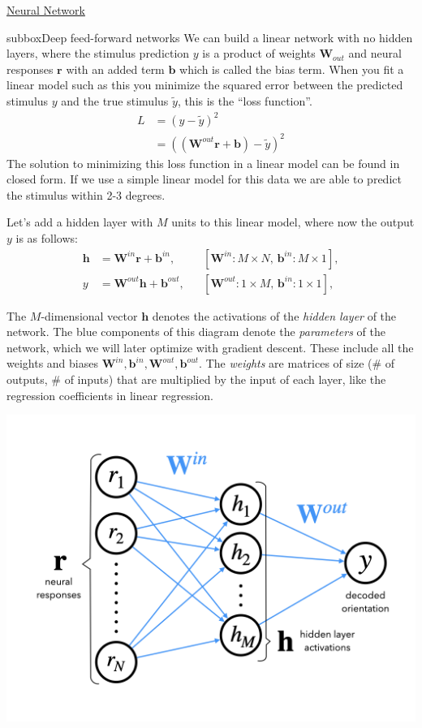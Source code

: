 \begin{textbox}{\href{https://compneuro.neuromatch.io/tutorials/W1D5_DeepLearning/student/W1D5_Tutorial1.html}{Neural Network } }
\begin{subbox}{subbox}{Deep feed-forward networks}
\scriptsize
We can build a linear network with no hidden layers, where the stimulus prediction $y$ is a product of weights $\mathbf{W}_{out}$ and neural responses $\mathbf{r}$ with an added term $\mathbf{b}$ which is called the bias term. When you fit a linear model such as this you minimize the squared error between the predicted stimulus $y$ and the true stimulus $\tilde{y}$, this is the “loss function”. 
\begin{align}
    L &= (y - \tilde{y})^2 \\
     &= ((\mathbf{W}^{out} \mathbf{r} + \mathbf{b}) - \tilde{y})^2
\end{align}
The solution to minimizing this loss function in a linear model can be found in closed form. If we use a simple linear model for this data we are able to predict the stimulus within 2-3 degrees. 

Let’s add a hidden layer with $M$ units to this linear model, where now the output $y$ is as follows:
\begin{align}
    \mathbf{h} &= \mathbf{W}^{in} \mathbf{r} + \mathbf{b}^{in}, && [\mathbf{W}^{in}: M \times N,\, \mathbf{b}^{in}: M \times 1], \\
    y &= \mathbf{W}^{out} \mathbf{h} + \mathbf{b}^{out},  && [\mathbf{W}^{out}: 1 \times M,\, \mathbf{b}^{in}: 1 \times 1],
\end{align}

The $M$-dimensional vector $\mathbf{h}$ denotes the activations of the \textit{hidden layer} of the network. The blue components of this diagram denote the \textit{parameters} of the network, which we will later optimize with gradient descent. These include all the weights and biases $\mathbf{W}^{in}, \mathbf{b}^{in}, \mathbf{W}^{out}, \mathbf{b}^{out}$. The \textit{weights} are matrices of size (# of outputs, # of inputs) that are multiplied by the input of each layer, like the regression coefficients in linear regression.

\centering
\includegraphics[scale=0.1]{Figures/DL/DLFigure1.png}
\end{subbox}



\end{textbox}
